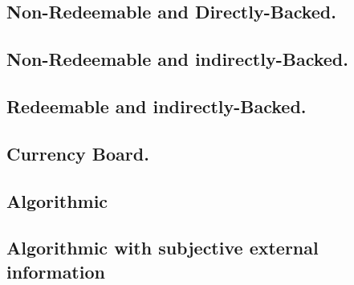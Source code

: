 \subsection{Non-Redeemable and Directly-Backed.} 


\subsection{Non-Redeemable and indirectly-Backed.} 


\subsection{Redeemable and indirectly-Backed.} 

 \subsection{Currency Board.} 

\subsection{Algorithmic}


\subsection{Algorithmic with subjective external information} 

